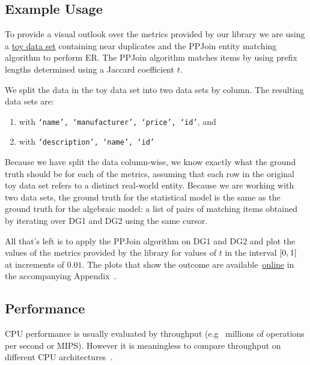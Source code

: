 \documentclass[a4paper,twoside]{article}
\newcommand{\appendixurl}{https://matchescu.github.io/py-resolve-metrics/article/02_appendix.pdf}
\begin{document}
    \subsection{Example Usage}

    To provide a visual outlook over the metrics provided by our library we are
    using a \href{https://github.com/matchescu/experiment-data}{toy data set}\cite{expdata2023}
    containing near duplicates and the PPJoin\cite{ppjoin} entity matching
    algorithm to perform ER.
    The PPJoin algorithm matches items by using prefix lengths determined using
    a Jaccard coefficient $t$.
    
    We split the data in the toy data set into two data sets by column.
    The resulting data sets are:
    
    \begin{enumerate}[label={\bfseries DG\arabic*:},leftmargin=1cm]
        \item with \texttt{`name', `manufacturer', `price', `id'},
        and
        \item with \texttt{`description', `name', `id'}\@
    \end{enumerate}

    Because we have split the data column-wise, we know exactly what the ground
    truth should be for each of the metrics, assuming that each row in the
    original toy data set refers to a distinct real-world entity.
    Because we are working with two data sets, the ground truth for the
    statistical model is the same as the ground truth for the algebraic model:
    a list of pairs of matching items obtained by iterating over DG1 and DG2
    using the same cursor.

    All that's left is to apply the PPJoin algorithm on DG1 and DG2 and plot the
    values of the metrics provided by the library for values of $t$ in the
    interval $\rinterval{0}{1}$ at increments of $0.01$.
    The plots that show the outcome are available~\href{\appendixurl}{online} in
    the accompanying Appendix~\cite{appendix2024}.

    \subsection{Performance}

    CPU performance is usually evaluated by throughput (e.g~ millions of
    operations per second or MIPS).
    However it is meaningless to compare throughput on different CPU
    architectures~\cite{jain1991profiling}.
\end{document}
